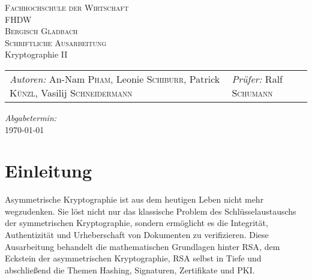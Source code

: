 \documentclass[a4paper, fontsize=12pt, parskip=full, toc=bibliographynumbered]{scrreprt}
\begin{document}
\newcommand{\headerrule}{\tabucline -}
\newcommand{\abbildung}[2]{\begin{figure}\centering
    \fbox{\texttt{[image: \#1]}}\caption{#2}
    \label{fig:#1}\end{figure}}

\author{}
\begin{titlepage}
  \begin{center}
    \textsc{\large Fachhochschule der Wirtschaft\\FHDW}\\[1em]
    \textsc{\large Bergisch Gladbach}\\[2em]
    \textsc{Schriftliche Ausarbeitung}\\[6em]
    {\LARGE Kryptographie II}\\[25em]
    \begin{tabu} to 0.8\textwidth {X[l] X[r]}
      \emph{Autoren:}\linebreak
      An-Nam \textsc{Pham},\linebreak
      Leonie \textsc{Schiburr},\linebreak
      Patrick \textsc{Künzl},\linebreak
      Vasilij \textsc{Schneidermann}
      &
      \emph{Prüfer:}\linebreak
      Ralf \textsc{Schumann}
    \end{tabu}
    \vfill
    \emph{Abgabetermin:}\\
    \today
  \end{center}
\end{titlepage}



\tableofcontents
\listoffigures
\listoftables
\lstlistoflistings
\clearpage
{}
\setcounter{page}{1}

\author{Vasilij Schneidermann}
\chapter{Einleitung}

Asymmetrische Kryptographie ist aus dem heutigen Leben nicht mehr
wegzudenken.  Sie löst nicht nur das klassische Problem des
Schlüsselaustauschs der symmetrischen Kryptographie, sondern
ermöglicht es die Integrität, Authentizität und Urheberschaft von
Dokumenten zu verifizieren.  Diese Ausarbeitung behandelt die
mathematischen Grundlagen hinter \ac{RSA}, dem Eckstein der
asymmetrischen Kryptographie, \ac{RSA} selbst in Tiefe und
abschließend die Themen Hashing, Signaturen, Zertifikate und \ac{PKI}.
\end{document}
